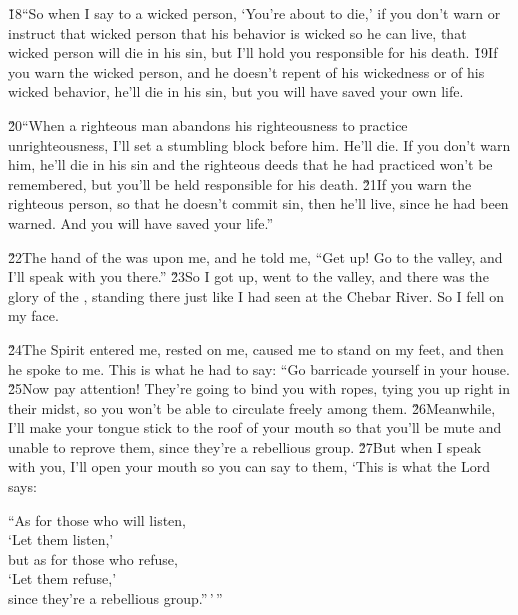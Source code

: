 \v{18}``So when I say to a wicked person, `You're about to die,' if you don't warn or instruct that wicked person that his behavior is wicked so he can live, that wicked person will die in his sin, but I'll hold you responsible for his death. \v{19}If you warn the wicked person, and he doesn't repent of his wickedness or of his wicked behavior, he'll die in his sin, but you will have saved your own life.

\v{20}``When a righteous man abandons his righteousness to practice unrighteousness, I'll set a stumbling block before him. He'll die. If you don't warn him, he'll die in his sin and the righteous deeds that he had practiced won't be remembered, but you'll be held responsible for his death. \v{21}If you warn the righteous person, so that he doesn't commit sin, then he'll live, since he had been warned. And you will have saved your life.''

\v{22}The hand of the  was upon me, and he told me, ``Get up! Go to the valley, and I'll speak with you there.'' \v{23}So I got up, went to the valley, and there was the glory of the , standing there just like I had seen at the Chebar River. So I fell on my face.

\v{24}The Spirit entered me, rested on me, caused me to stand on my feet, and then he spoke to me. This is what he had to say: ``Go barricade yourself in your house. \v{25}Now pay attention! They're going to bind you with ropes, tying you up right in their midst, so you won't be able to circulate freely among them. \v{26}Meanwhile, I'll make your tongue stick to the roof of your mouth so that you'll be mute and unable to reprove them, since they're a rebellious group. \v{27}But when I speak with you, I'll open your mouth so you can say to them, `This is what the Lord  says:

\begin{poetry}
\poeml ``As for those who will listen, \\
\poemll    `Let them listen,' \\
\poeml but as for those who refuse, \\
\poemll    `Let them refuse,' \\
\poemlll       since they're a rebellious group.''\,'\,''
\end{poetry}

